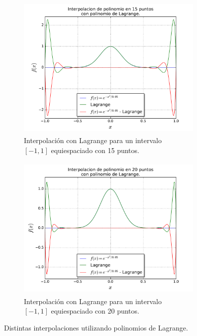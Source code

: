 \documentclass[a4paper, 11pt, spanish]{article}
\begin{document}
\begin{figure}[!hbpt]
\begin{subfigure}{.5\textwidth}
\end{subfigure}
\begin{subfigure}{.5\textwidth}
  \centering
  \includegraphics[width=9cm, height=7cm]{img/lagrange15.pdf}
  \caption{Interpolaci\'on con Lagrange para un intervalo\\ $[-1,1]$ equiespaciado con 15 puntos.}
\end{subfigure}%
\begin{subfigure}{.5\textwidth}
  \centering
  \includegraphics[width=9cm, height=7cm]{img/lagrange20.pdf}
  \caption{Interpolaci\'on con Lagrange para un intervalo\\ $[-1,1]$ equiespaciado con 20 puntos.}
\end{subfigure}
\caption{Distintas interpolaciones utilizando polinomios de Lagrange.}
\end{figure}
\end{document}
